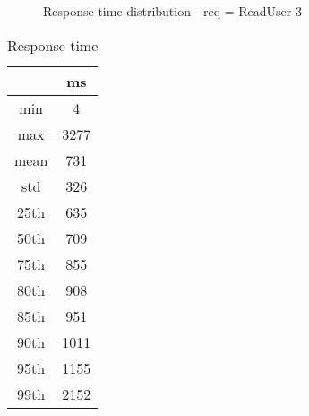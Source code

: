 \begin{minipage}{0.75\linewidth}
\begin{figure}[h]
\begin{adjustbox}{max width=1.0\linewidth, keepaspectratio}
  \end{adjustbox}
  \caption{Response time distribution - req = ReadUser-3}
\end{figure}
\end{minipage}\hfill\begin{minipage}{0.18\linewidth}
\begin{table}[h]
\begin{tabular}{|cc|}
\hline
\textbf{} & \textbf{ms}\\ \hline
 \Xhline{0.005\arrayrulewidth}
min & 4\\
 \Xhline{0.005\arrayrulewidth}
max & 3277\\
 \Xhline{0.005\arrayrulewidth}
mean & 731\\
 \Xhline{0.005\arrayrulewidth}
std & 326\\
\hline
\hline
 \Xhline{0.005\arrayrulewidth}
25th & 635\\
 \Xhline{0.005\arrayrulewidth}
50th & 709\\
 \Xhline{0.005\arrayrulewidth}
75th & 855\\
 \Xhline{0.005\arrayrulewidth}
80th & 908\\
 \Xhline{0.005\arrayrulewidth}
85th & 951\\
 \Xhline{0.005\arrayrulewidth}
90th & 1011\\
 \Xhline{0.005\arrayrulewidth}
95th & 1155\\
 \Xhline{0.005\arrayrulewidth}
99th & 2152\\
\hline
\end{tabular}
\caption{Response time}
\end{table}
\end{minipage}\hfill